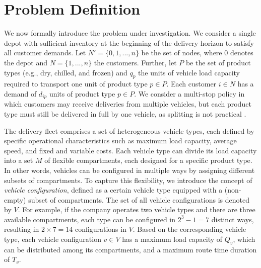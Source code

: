 \documentclass[11pt]{elsarticle}
\theoremstyle{plain}
\begin{document}
\section{Problem Definition} \label{sec:problem_definition}

We now formally introduce the problem under investigation. 
We consider a single depot with sufficient inventory at the beginning of the delivery horizon to satisfy all customer demands. Let $N' = \{0, 1, ..., n\}$ be the set of nodes, where $0$ denotes the depot and $N=\{1, ..., n\}$ the customers. 
Further, let $P$ be the set of product types (e.g., dry, chilled, and frozen) and $q_p$ the units of vehicle load capacity required to transport one unit of product type $p \in P$. Each customer $i \in N$ has a demand of $d_{ip}$ units of product type $p \in P$. We consider a multi-stop policy in which customers may receive deliveries from multiple vehicles, but each product type must still be delivered in full by one vehicle, as splitting is not practical \citep{gu2024vehicle}.

The delivery fleet comprises a set of heterogeneous vehicle types, each defined by specific operational characteristics such as maximum load capacity, average speed, and fixed and variable costs. Each vehicle type can divide its load capacity into a set $M$ of flexible compartments, each designed for a specific product type. In other words, vehicles can be configured in multiple ways by assigning different subsets of compartments. To capture this flexibility,
we introduce the concept of \emph{vehicle configuration}, defined as a certain vehicle type equipped with a (non-empty) subset of compartments. The set of all vehicle configurations is denoted by $V$. For example, if the company operates two vehicle types and there are three available compartments, each type can be configured in $2^3 - 1 = 7$ distinct ways, resulting in $2 \times 7 = 14$ configurations in $V$. Based on the corresponding vehicle type, each vehicle configuration $v \in V$ has a maximum load capacity of $Q_v$, which can be distributed among its compartments, and a maximum route time duration of $T_v$. 
\end{document}
